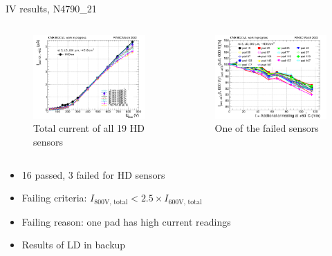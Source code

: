 \documentclass{beamer}
\begin{document}
\begin{frame}{IV results, N4790\_21}
   \begin{columns}
        \begin{figure}
            \includegraphics[width=1.0\textwidth]{plots/annealing_IV_ch101_N4790_21.png}
            \caption{Total current of all 19 HD sensors}
        \end{figure}

        \begin{figure}
            \includegraphics[width=1.0\textwidth]{plots/annealing_current_N4790_21.png}
            \caption{One of the failed sensors}
        \end{figure}

    \end{columns}

    \begin{itemize}
        \item \alert{16 passed}, \alert{3 failed} for HD sensors
        \item Failing criteria:  $I_\text{800V, total} < 2.5 \times I_\text{600V, total}$
        \item Failing reason: one pad has high current readings
        \item Results of LD in backup
    \end{itemize}
\end{frame}
\end{document}
